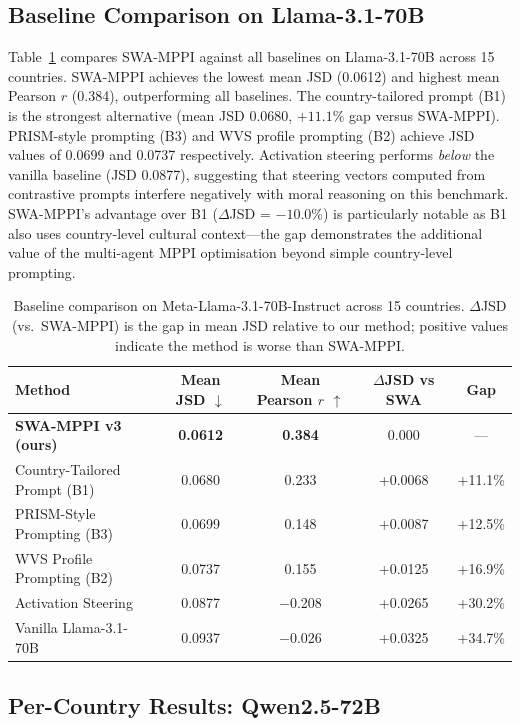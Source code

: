 \documentclass{article}
\begin{document}
\subsection{Baseline Comparison on Llama-3.1-70B}
\label{sec:results:baselines}

Table~\ref{tab:baselines} compares SWA-MPPI against all baselines on Llama-3.1-70B across
15 countries. SWA-MPPI achieves the lowest mean JSD (0.0612) and highest mean Pearson
$r$ (0.384), outperforming all baselines. The country-tailored prompt (B1) is the
strongest alternative (mean JSD 0.0680, $+11.1\%$ gap versus SWA-MPPI). PRISM-style
prompting (B3) and WVS profile prompting (B2) achieve JSD values of 0.0699 and 0.0737
respectively. Activation steering performs \emph{below} the vanilla baseline
(JSD 0.0877), suggesting that steering vectors computed from contrastive prompts
interfere negatively with moral reasoning on this benchmark. SWA-MPPI's advantage over
B1 ($\Delta$JSD = $-10.0\%$) is particularly notable as B1 also uses country-level
cultural context---the gap demonstrates the additional value of the multi-agent MPPI
optimisation beyond simple country-level prompting.

\begin{table}[t]
\caption{Baseline comparison on Meta-Llama-3.1-70B-Instruct across 15 countries.
$\Delta$JSD (vs.\ SWA-MPPI) is the gap in mean JSD relative to our method; positive
values indicate the method is worse than SWA-MPPI.}
\label{tab:baselines}
\centering
\begin{tabular}{lcccc}
\toprule
Method & Mean JSD $\downarrow$ & Mean Pearson $r$ $\uparrow$ & $\Delta$JSD vs SWA & Gap \\
\midrule
\textbf{SWA-MPPI v3 (ours)} & \textbf{0.0612} & \textbf{0.384} & 0.000 & --- \\
Country-Tailored Prompt (B1) & 0.0680 & 0.233 & +0.0068 & +11.1\% \\
PRISM-Style Prompting (B3)   & 0.0699 & 0.148 & +0.0087 & +12.5\% \\
WVS Profile Prompting (B2)   & 0.0737 & 0.155 & +0.0125 & +16.9\% \\
Activation Steering          & 0.0877 & $-$0.208 & +0.0265 & +30.2\% \\
Vanilla Llama-3.1-70B        & 0.0937 & $-$0.026 & +0.0325 & +34.7\% \\
\bottomrule
\end{tabular}
\end{table}

\subsection{Per-Country Results: Qwen2.5-72B}
\label{sec:results:percountry}
\end{document}

